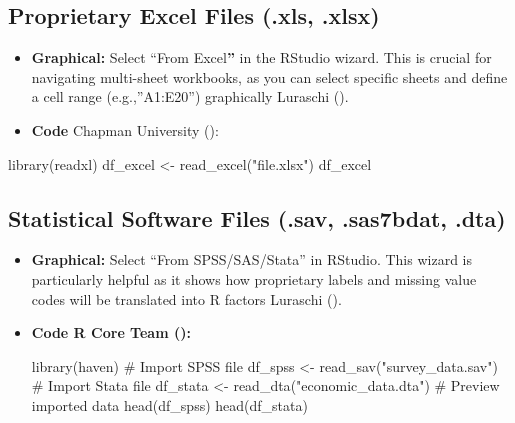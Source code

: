 \documentclass[
  doc,
  longtable,
  a4paper,
  nolmodern,
  notxfonts,
  notimes,
  colorlinks=true,linkcolor=blue,citecolor=blue,urlcolor=blue]{apa7}
\newenvironment{Shaded}{\begin{snugshade}}{\end{snugshade}}
\newcommand{\CommentTok}[1]{\textcolor[rgb]{0.37,0.37,0.37}{#1}}
\newcommand{\FunctionTok}[1]{\textcolor[rgb]{0.28,0.35,0.67}{#1}}
\newcommand{\NormalTok}[1]{\textcolor[rgb]{0.00,0.23,0.31}{#1}}
\newcommand{\OtherTok}[1]{\textcolor[rgb]{0.00,0.23,0.31}{#1}}
\newcommand{\StringTok}[1]{\textcolor[rgb]{0.13,0.47,0.30}{#1}}
\begin{document}
\subsection{Proprietary Excel Files (.xls,
.xlsx)}\label{proprietary-excel-files-.xls-.xlsx}

\begin{itemize}
\item
  \textbf{Graphical:} Select ``From Excel\textbf{''} in the RStudio
  wizard. This is crucial for navigating multi-sheet workbooks, as you
  can select specific sheets and define a cell range (e.g.,''A1:E20'')
  graphically Luraschi ().
\item
  \textbf{Code} Chapman University
  ():
\end{itemize}

\begin{Shaded}
\begin{Highlighting}[]
\FunctionTok{library}\NormalTok{(readxl)}
\NormalTok{df\_excel }\OtherTok{\textless{}{-}} \FunctionTok{read\_excel}\NormalTok{(}\StringTok{"file.xlsx"}\NormalTok{)}
\NormalTok{df\_excel}
\end{Highlighting}
\end{Shaded}

\subsection{Statistical Software Files (.sav, .sas7bdat,
.dta)}\label{statistical-software-files-.sav-.sas7bdat-.dta}

\begin{itemize}
\item
  \textbf{Graphical:} Select ``From SPSS/SAS/Stata'' in RStudio. This
  wizard is particularly helpful as it shows how proprietary labels and
  missing value codes will be translated into R factors Luraschi
  ().
\item
  \textbf{Code R Core Team ():}

\begin{Shaded}
\begin{Highlighting}[]
\FunctionTok{library}\NormalTok{(haven)}
\CommentTok{\# Import SPSS file}
\NormalTok{df\_spss }\OtherTok{\textless{}{-}} \FunctionTok{read\_sav}\NormalTok{(}\StringTok{"survey\_data.sav"}\NormalTok{)}
\CommentTok{\# Import Stata file}
\NormalTok{df\_stata }\OtherTok{\textless{}{-}} \FunctionTok{read\_dta}\NormalTok{(}\StringTok{"economic\_data.dta"}\NormalTok{)}
\CommentTok{\# Preview imported data}
\FunctionTok{head}\NormalTok{(df\_spss)}
\FunctionTok{head}\NormalTok{(df\_stata)}
\end{Highlighting}
\end{Shaded}
\end{itemize}
\end{document}
